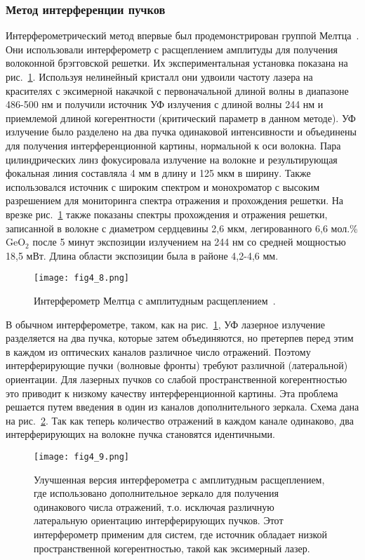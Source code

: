 \subsubsection{Метод интерференции пучков}

Интерферометрический метод впервые был продемонстрирован группой Мелтца~\cite{Meltz89}. Они использовали интерферометр с расщеплением амплитуды для получения волоконной брэгговской решетки. Их экспериментальная установка показана на рис.~\ref{fig4.8}. Используя нелинейный кристалл они удвоили частоту лазера на красителях с эксимерной накачкой с первоначальной длиной волны в диапазоне 486-500 нм и получили источник УФ излучения с длиной волны 244 нм и приемлемой длиной когерентности (критический параметр в данном методе). УФ излучение было разделено на два пучка одинаковой интенсивности и объединены для получения интерференционной картины, нормальной к оси волокна. Пара цилиндрических линз фокусировала излучение на волокне и результирующая фокальная линия составляла 4 мм в длину и 125 мкм в ширину. Также использовался источник с широким спектром и монохроматор с высоким разрешением для мониторинга спектра отражения и прохождения решетки. На врезке рис.~\ref{fig4.8} также показаны спектры прохождения и отражения решетки, записанной в волокне с диаметром сердцевины 2,6 мкм, легированного 6,6 мол.\% GeO$_2$ после 5 минут экспозиции излучением на 244 нм со средней мощностью 18,5 мВт. Длина области экспозиции была в районе 4,2-4,6 мм.

\begin{figure}
\centering
\texttt{[image: fig4\_8.png]}
\caption{Интерферометр Мелтца с амплитудным расщеплением~\cite{Meltz89}.}\label{fig4.8}
\end{figure}

В обычном интерферометре, таком, как на рис.~\ref{fig4.8}, УФ лазерное излучение разделяется на два пучка, которые затем объединяются, но претерпев перед этим в каждом из оптических каналов различное число отражений. Поэтому интерферирующие пучки (волновые фронты) требуют различной (латеральной) ориентации. Для лазерных пучков со слабой пространственной когерентностью это приводит к низкому качеству интерференционной картины. Эта проблема решается путем введения в один из каналов дополнительного зеркала. Схема дана на рис.~\ref{fig4.9}. Так как теперь количество отражений в каждом канале одинаково, два интерферирующих на волокне пучка становятся идентичными.

\begin{figure}
\centering
\texttt{[image: fig4\_9.png]}
\caption{Улучшенная версия интерферометра с амплитудным расщеплением, где использовано дополнительное зеркало для получения одинакового числа отражений, т.о. исключая различную латеральную ориентацию интерферирующих пучков. Этот интерферометр применим для систем, где источник обладает низкой пространственной когерентностью, такой как эксимерный лазер.}\label{fig4.9}
\end{figure}

